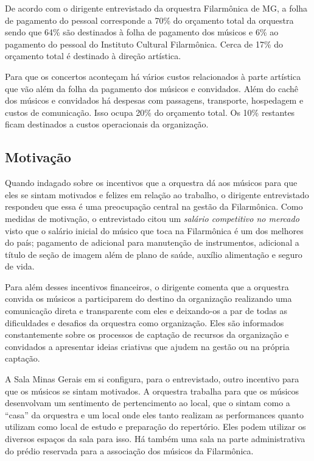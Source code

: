 \documentclass[a4paper, 12pt, openright, oneside, german, french, english, brazil]{abntex2}
\begin{document}
	De acordo com o dirigente entrevistado da orquestra Filarmônica de MG, a folha de pagamento do pessoal corresponde a 70\% do orçamento total da orquestra sendo que 64\% são destinados à folha de pagamento dos músicos e 6\% ao pagamento do pessoal do Instituto Cultural Filarmônica. Cerca de 17\% do orçamento total é destinado à direção artística.
	
	Para que os concertos aconteçam há vários custos relacionados à parte artística que vão além da folha da pagamento dos músicos e convidados. Além do cachê dos músicos e convidados há despesas com passagens, transporte, hospedagem e custos de comunicação. Isso ocupa 20\% do orçamento total. Os 10\% restantes ficam destinados a custos operacionais da organização.
	
	\subsection{Motivação}
	
	Quando indagado sobre os incentivos que a orquestra dá aos músicos para que eles se sintam motivados e felizes em relação ao trabalho, o dirigente entrevistado respondeu que essa é uma preocupação central na gestão da Filarmônica. Como medidas de motivação, o entrevistado citou um \textit{salário competitivo no mercado} visto que o salário inicial do músico que toca na Filarmônica é um dos melhores do país; pagamento de adicional para manutenção de instrumentos, adicional a título de seção de imagem além de plano de saúde, auxílio alimentação e seguro de vida.
	
	Para além desses incentivos financeiros, o dirigente comenta que a orquestra convida os músicos a participarem do destino da organização realizando uma comunicação direta e transparente com eles e deixando-os a par de todas as dificuldades e desafios da orquestra como organização. Eles são informados constantemente sobre os processos de captação de recursos da organização e convidados a apresentar ideias criativas que ajudem na gestão ou na própria captação.
	
	A Sala Minas Gerais em si configura, para o entrevistado, outro incentivo para que os músicos se sintam motivados. A orquestra trabalha para que os músicos desenvolvam um sentimento de pertencimento ao local, que o sintam como a ``casa'' da orquestra e um local onde eles tanto realizam as performances quanto utilizam como local de estudo e preparação do repertório. Eles podem utilizar os diversos espaços da sala para isso. Há também uma sala na parte administrativa do prédio reservada para a associação dos músicos da Filarmônica.
	
\end{document}
